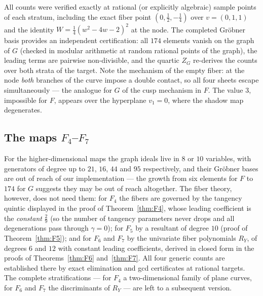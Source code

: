 \documentclass[11pt]{article}
\theoremstyle{plain}
\theoremstyle{definition}
\theoremstyle{remark}
\begin{document}
All counts were verified exactly at rational (or explicitly algebraic) sample
points of each stratum, including the exact fiber point
$(0,\tfrac12,-\tfrac14)$ over $v=(0,1,1)$ and the identity
$W=\tfrac14(w^2-4w-2)^2$ at the node. The completed Gr\"obner basis provides
an independent certification: all $174$ elements vanish on the graph of $G$
(checked in modular arithmetic at random rational points of the graph), the
leading terms are pairwise non-divisible, and the quartic $Z_G$ re-derives
the counts over both strata of the target. Note the mechanism of the empty fiber: at
the node \emph{both} branches of the curve impose a double contact, so all four
sheets escape simultaneously --- the analogue for $G$ of the cusp mechanism in
$F$. The value $3$, impossible for $F$, appears over the hyperplane $v_1=0$,
where the shadow map degenerates.

\subsection{The maps $F_4$--$F_7$}\label{app:F4}

For the higher-dimensional maps the graph ideals live in $8$ or $10$
variables, with generators of degree up to $21$, $16$, $44$ and $95$
respectively, and their Gr\"obner bases are out of reach of our implementation
--- the growth from six elements for $F$ to $174$ for $G$ suggests they may be
out of reach altogether. The fiber theory, however, does not need them: for
$F_4$ the fibers are governed by the tangency quintic displayed in the proof
of Theorem~\ref{thm:F4}, whose leading coefficient is the \emph{constant}
$\tfrac29$ (so the number of tangency parameters never drops and all
degenerations pass through $\gamma=0$); for $F_5$ by a resultant of degree
$10$ (proof of Theorem~\ref{thm:F5}); and for $F_6$ and $F_7$ by the
univariate fiber polynomials $R_Y$, of degrees $6$ and $12$ with constant
leading coefficients, derived in closed form in the proofs of
Theorems~\ref{thm:F6} and~\ref{thm:F7}. All four generic counts are
established there by exact elimination and gcd certificates at rational
targets. The complete stratifications --- for $F_4$ a two-dimensional
family of plane curves, for $F_6$ and $F_7$ the discriminants of $R_Y$ ---
are left to a subsequent version.
\end{document}
